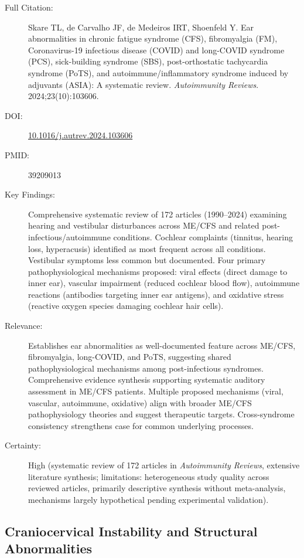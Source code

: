 \begin{description}
    \item[Full Citation:] Skare TL, de Carvalho JF, de Medeiros IRT, Shoenfeld Y. Ear abnormalities in chronic fatigue syndrome (CFS), fibromyalgia (FM), Coronavirus-19 infectious disease (COVID) and long-COVID syndrome (PCS), sick-building syndrome (SBS), post-orthostatic tachycardia syndrome (PoTS), and autoimmune/inflammatory syndrome induced by adjuvants (ASIA): A systematic review. \textit{Autoimmunity Reviews}. 2024;23(10):103606.
    \item[DOI:] \href{https://doi.org/10.1016/j.autrev.2024.103606}{10.1016/j.autrev.2024.103606}
    \item[PMID:] 39209013
    \item[Key Findings:] Comprehensive systematic review of 172 articles (1990--2024) examining hearing and vestibular disturbances across ME/CFS and related post-infectious/autoimmune conditions. Cochlear complaints (tinnitus, hearing loss, hyperacusis) identified as most frequent across all conditions. Vestibular symptoms less common but documented. Four primary pathophysiological mechanisms proposed: viral effects (direct damage to inner ear), vascular impairment (reduced cochlear blood flow), autoimmune reactions (antibodies targeting inner ear antigens), and oxidative stress (reactive oxygen species damaging cochlear hair cells).
    \item[Relevance:] Establishes ear abnormalities as well-documented feature across ME/CFS, fibromyalgia, long-COVID, and PoTS, suggesting shared pathophysiological mechanisms among post-infectious syndromes. Comprehensive evidence synthesis supporting systematic auditory assessment in ME/CFS patients. Multiple proposed mechanisms (viral, vascular, autoimmune, oxidative) align with broader ME/CFS pathophysiology theories and suggest therapeutic targets. Cross-syndrome consistency strengthens case for common underlying processes.
    \item[Certainty:] High (systematic review of 172 articles in \emph{Autoimmunity Reviews}, extensive literature synthesis; limitations: heterogeneous study quality across reviewed articles, primarily descriptive synthesis without meta-analysis, mechanisms largely hypothetical pending experimental validation).
\end{description}

\subsection{Craniocervical Instability and Structural Abnormalities}

